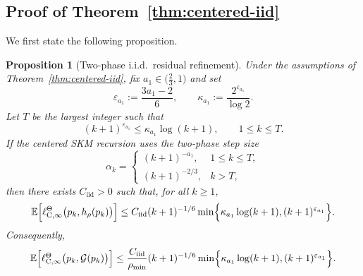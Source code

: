 \documentclass{article}
\newtheorem{proposition}[theorem]{Proposition}
\newcommand{\E}{\mathbb{E}}
\begin{document}
\subsection{Proof of Theorem~\ref{thm:centered-iid}}
We first state the following proposition.
\begin{proposition}[Two-phase i.i.d.\ residual refinement]\label{prop:centered-iid-two-phase}
Under the assumptions of Theorem~\ref{thm:centered-iid}, fix $a_1 \in \bigl(\frac23,1\bigr)$ and set
\begin{equation}
\varepsilon_{a_1}:=\frac{3a_1-2}{6},\qquad \kappa_{a_1}:=\frac{2^{\varepsilon_{a_1}}}{\log 2}.
\end{equation}
Let $T$ be the largest integer such that
\begin{equation}\label{eq:two-phase-threshold}
(k+1)^{\varepsilon_{a_1}}\le \kappa_{a_1}\log(k+1),\qquad 1\le k\le T.
\end{equation}
If the centered SKM recursion uses the two-phase step size
\begin{equation}\label{eq:two-phase-stepsize}
\alpha_k =
\begin{cases}
(k+1)^{-a_1}, & 1\le k\le T,\\
(k+1)^{-2/3}, & k>T,
\end{cases}
\end{equation}
then there exists $C_{\mathrm{iid}} >0$ such that, for all $k\ge1$,
\begin{equation}
\E\Bigl[\ell^\Theta_{\mathrm C,\infty}\bigl(p_k,h_\rho(p_k)\bigr)\Bigr]\le C_{\mathrm{iid}}(k+1)^{-1/6}\min\Bigl\{\kappa_{a_1}\log(k+1),(k+1)^{\varepsilon_{a_1}}\Bigr\}.
\end{equation}
Consequently,
\begin{equation}
\E\Bigl[\ell^\Theta_{\mathrm C,\infty}\bigl(p_k,\mathcal G(p_k)\bigr)\Bigr]\le \frac{C_{\mathrm{iid}}}{\rho_{\min}}(k+1)^{-1/6}\min\Bigl\{\kappa_{a_1}\log(k+1),(k+1)^{\varepsilon_{a_1}}\Bigr\}.
\end{equation}
\end{proposition}
\end{document}
